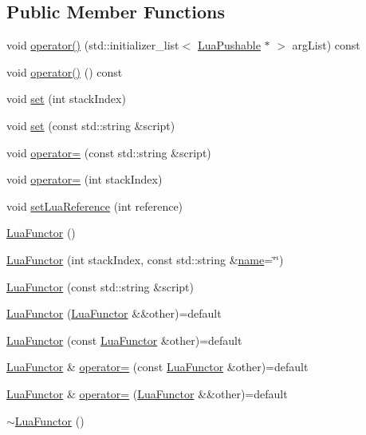 \subsection*{Public Member Functions}
\begin{DoxyCompactItemize}
\item 
void \hyperlink{classZeta_1_1LuaFunctor_ae55fd17050bf4caa280ba050da6b3fe7}{operator()} (std\+::initializer\+\_\+list$<$ \hyperlink{classZeta_1_1LuaPushable}{Lua\+Pushable} $\ast$ $>$ arg\+List) const 
\item 
void \hyperlink{classZeta_1_1LuaFunctor_acf00a4d0775702e50cbd3ea2f8e7a480}{operator()} () const 
\item 
void \hyperlink{classZeta_1_1LuaFunctor_a98abacbb6f907e8cd94256ca91d9cafc}{set} (int stack\+Index)
\item 
void \hyperlink{classZeta_1_1LuaFunctor_a0c68049e101d7b1d869f701f1a9b5d90}{set} (const std\+::string \&script)
\item 
void \hyperlink{classZeta_1_1LuaFunctor_a6b31b753129eaf7a32904842c9a6efc1}{operator=} (const std\+::string \&script)
\item 
void \hyperlink{classZeta_1_1LuaFunctor_acff4acd53e83b765f55942c6c9b0d156}{operator=} (int stack\+Index)
\item 
void \hyperlink{classZeta_1_1LuaFunctor_a6ec24e778260eec5818278d6bbed01c3}{set\+Lua\+Reference} (int reference)
\item 
\hyperlink{classZeta_1_1LuaFunctor_acee7d7515bdc178e27d441984dfdd1b7}{Lua\+Functor} ()
\item 
\hyperlink{classZeta_1_1LuaFunctor_a627928b600c176a8366da8c9ea3a4bb2}{Lua\+Functor} (int stack\+Index, const std\+::string \&\hyperlink{classZeta_1_1LuaReferenced_ad6f7a947b37382f9968f4a54bd718119}{name}=\char`\"{}\char`\"{})
\item 
\hyperlink{classZeta_1_1LuaFunctor_a2b7dc6b3983b44d18ceb15a3d45d8196}{Lua\+Functor} (const std\+::string \&script)
\item 
\hyperlink{classZeta_1_1LuaFunctor_af63f9d94a52a280a8293b7d04713facb}{Lua\+Functor} (\hyperlink{classZeta_1_1LuaFunctor}{Lua\+Functor} \&\&other)=default
\item 
\hyperlink{classZeta_1_1LuaFunctor_aa6d2720639d0c9be429404caf0b13983}{Lua\+Functor} (const \hyperlink{classZeta_1_1LuaFunctor}{Lua\+Functor} \&other)=default
\item 
\hyperlink{classZeta_1_1LuaFunctor}{Lua\+Functor} \& \hyperlink{classZeta_1_1LuaFunctor_a126209ca362d7593a02fc038a8e0a743}{operator=} (const \hyperlink{classZeta_1_1LuaFunctor}{Lua\+Functor} \&other)=default
\item 
\hyperlink{classZeta_1_1LuaFunctor}{Lua\+Functor} \& \hyperlink{classZeta_1_1LuaFunctor_a8a29527d610ea86a5fc79956e0b54cab}{operator=} (\hyperlink{classZeta_1_1LuaFunctor}{Lua\+Functor} \&\&other)=default
\item 
\hyperlink{classZeta_1_1LuaFunctor_a02432a039f85d8d460311bbb0f48ec79}{$\sim$\+Lua\+Functor} ()
\end{DoxyCompactItemize}
